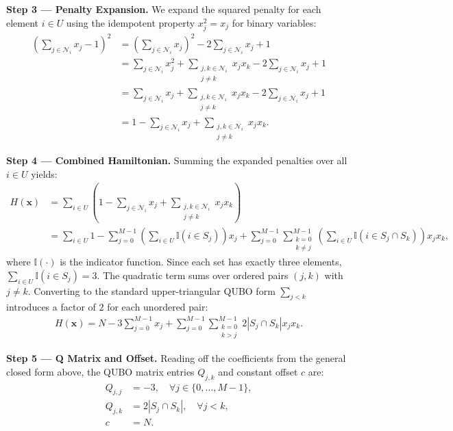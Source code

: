 \documentclass[12pt]{article}
\begin{document}
\textbf{Step 3 --- Penalty Expansion.} We expand the squared penalty for each element $i \in U$ using the idempotent property $x_j^2 = x_j$ for binary variables:
\begin{align}
\left( \sum_{j \in \mathcal{N}_i} x_j - 1 \right)^2 &= \left( \sum_{j \in \mathcal{N}_i} x_j \right)^2 - 2 \sum_{j \in \mathcal{N}_i} x_j + 1 \nonumber \\
&= \sum_{j \in \mathcal{N}_i} x_j^2 + \sum_{\substack{j,k \in \mathcal{N}_i \\ j \neq k}} x_j x_k - 2 \sum_{j \in \mathcal{N}_i} x_j + 1 \nonumber \\
&= \sum_{j \in \mathcal{N}_i} x_j + \sum_{\substack{j,k \in \mathcal{N}_i \\ j \neq k}} x_j x_k - 2 \sum_{j \in \mathcal{N}_i} x_j + 1 \nonumber \\
&= 1 - \sum_{j \in \mathcal{N}_i} x_j + \sum_{\substack{j,k \in \mathcal{N}_i \\ j \neq k}} x_j x_k.
\end{align}

\textbf{Step 4 --- Combined Hamiltonian.} Summing the expanded penalties over all $i \in U$ yields:
\begin{align}
H(\mathbf{x}) &= \sum_{i \in U} \left( 1 - \sum_{j \in \mathcal{N}_i} x_j + \sum_{\substack{j,k \in \mathcal{N}_i \\ j \neq k}} x_j x_k \right) \nonumber \\
&= \sum_{i \in U} 1 - \sum_{j=0}^{M-1} \left( \sum_{i \in U} \mathbb{I}(i \in S_j) \right) x_j + \sum_{j=0}^{M-1} \sum_{\substack{k=0 \\ k \neq j}}^{M-1} \left( \sum_{i \in U} \mathbb{I}(i \in S_j \cap S_k) \right) x_j x_k,
\end{align}
where $\mathbb{I}(\cdot)$ is the indicator function. Since each set has exactly three elements, $\sum_{i \in U} \mathbb{I}(i \in S_j) = 3$. The quadratic term sums over ordered pairs $(j,k)$ with $j \neq k$. Converting to the standard upper-triangular QUBO form $\sum_{j < k}$ introduces a factor of $2$ for each unordered pair:
\begin{align}
H(\mathbf{x}) = N - 3 \sum_{j=0}^{M-1} x_j + \sum_{j=0}^{M-1} \sum_{\substack{k=0 \\ k > j}}^{M-1} 2 |S_j \cap S_k| x_j x_k.
\end{align}

\textbf{Step 5 --- Q Matrix and Offset.} Reading off the coefficients from the general closed form above, the QUBO matrix entries $Q_{j,k}$ and constant offset $c$ are:
\begin{align}
Q_{j,j} &= -3, \quad \forall j \in \{0, \dots, M-1\}, \\
Q_{j,k} &= 2 |S_j \cap S_k|, \quad \forall j < k, \\
c &= N.
\end{align}
\end{document}
